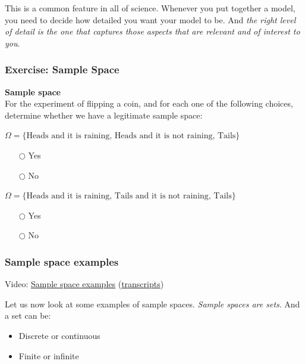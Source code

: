\documentclass[pdftex, brazil, 12pt, twoside]{article}
\begin{document}
This is a common feature in all of science.
Whenever you put together a model, you need to decide how
detailed you want your model to be.
And \emph{the right level of detail is the one that captures those
  aspects that are relevant and of interest to you}.

\subsubsection{Exercise: Sample Space}
\label{un1-lec1-exec-sample-space}

\begin{exercise}
  \textbf{Sample space}\\
  For the experiment of flipping a coin, and for each one of the following choices,
  determine whether we have a legitimate sample space:

  $\Omega = \{\text{Heads and it is raining, Heads and it is not raining, Tails}\}$
  \begin{itemize}[noitemsep]
  \item[$\bigcirc$] Yes
  \item[$\bigcirc$] No
  \end{itemize}

  $\Omega = \{\text{Heads and it is raining, Tails and it is not raining, Tails}\}$
  \begin{itemize}[noitemsep]
  \item[$\bigcirc$] Yes
  \item[$\bigcirc$] No
  \end{itemize}
\end{exercise}

\subsubsection{Sample space examples}
\label{un1-lec1-sample-space-exs}

Video: \href{https://www.youtube.com/watch?v=iUF5n3Ou7Sc}{Sample space examples}
(\href{Unit-1/01\_lecture\_1\_probability\_models\_and\_axioms/l01\_2\_transcripts.pdf}{transcripts})

Let us now look at some examples of sample spaces.
\emph{Sample spaces are sets}. And a set can be:

\begin{itemize}
\item Discrete or continuous
\item Finite or infinite
\end{itemize}
\end{document}
